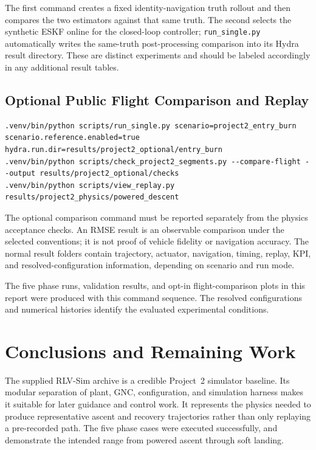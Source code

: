 \documentclass[11pt,letterpaper]{article}
\newcommand{\sourcecode}[1]{\texttt{#1}}
\begin{document}
The first command creates a fixed identity-navigation truth rollout and then compares the two
estimators against that same truth. The second selects the synthetic ESKF online for the
closed-loop controller; \sourcecode{run\_single.py} automatically writes the same-truth
post-processing comparison into its Hydra result directory. These are distinct experiments and
should be labeled accordingly in any additional result tables.

\subsection{Optional Public Flight Comparison and Replay}
\begin{lstlisting}
.venv/bin/python scripts/run_single.py scenario=project2_entry_burn scenario.reference.enabled=true hydra.run.dir=results/project2_optional/entry_burn
.venv/bin/python scripts/check_project2_segments.py --compare-flight --output results/project2_optional/checks
.venv/bin/python scripts/view_replay.py results/project2_physics/powered_descent
\end{lstlisting}

The optional comparison command must be reported separately from the physics acceptance checks. An RMSE result is an observable comparison under the selected conventions; it is not proof of vehicle fidelity or navigation accuracy. The normal result folders contain trajectory, actuator, navigation, timing, replay, KPI, and resolved-configuration information, depending on scenario and run mode.

The five phase runs, validation results, and opt-in flight-comparison plots in this report were produced with this command sequence. The resolved configurations and numerical histories identify the evaluated experimental conditions.



\section{Conclusions and Remaining Work}\label{sec:conclusion}

The supplied RLV-Sim archive is a credible Project~2 simulator baseline. Its modular separation of plant, GNC, configuration, and simulation harness makes it suitable for later guidance and control work. It represents the physics needed to produce representative ascent and recovery trajectories rather than only replaying a pre-recorded path. The five phase cases were executed successfully, and demonstrate the intended range from powered ascent through soft landing.
\end{document}
